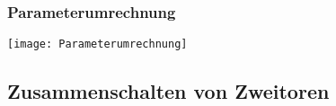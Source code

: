 \subsubsection{Parameterumrechnung}
\texttt{[image: Parameterumrechnung]}\\

\subsection{Zusammenschalten von Zweitoren}

